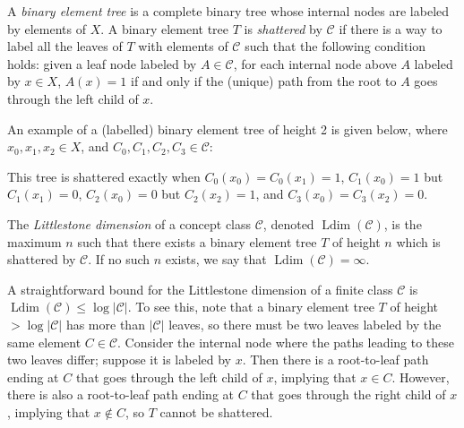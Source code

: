 \documentclass[runningheads]{llncs}
\newcommand{\mc}{\mathcal}
\DeclareMathOperator{\Ldim}{Ldim}
\begin{document}
A \emph{binary element tree} is a complete binary tree whose internal nodes are labeled by elements of $X$. 
A binary element tree $T$ is \emph{shattered} by $\mc C$ if there is a way to label all the leaves of $T$ with elements of $\mc C$ such that the following condition holds: given a leaf node labeled by $A \in \mc C$, for each internal node above $A$ labeled by $x \in X$, $A(x)=1$ if and only if the (unique) path from the root to $A$ goes through the left child of $x$. 

An example of a (labelled) binary element tree of height 2 is given below, where $x_0, x_1, x_2 \in X$, and $C_0, C_1, C_2, C_3 \in \mc C$:

\begin{center}
\end{center}

This tree is shattered exactly when $C_0(x_0) = C_0(x_1) = 1$, $C_1(x_0) = 1$ but $C_1(x_1) = 0$, $C_2(x_0) = 0$ but $C_2(x_2) = 1$, and $C_3(x_0) = C_3(x_2) = 0$.

\begin{definition}
    The \emph{Littlestone dimension} of a concept class $\mc C$, denoted $\Ldim(\mc C)$, is the maximum $n$ such that there exists a binary element tree $T$ of height $n$ which is shattered by $\mc C$. 
    If no such $n$ exists, we say that $\Ldim(\mc C) = \infty$. 
\end{definition}

\begin{remark} \label{remark:littlestone dimension of a finite class}
    A straightforward bound for the Littlestone dimension of a finite class $\mc C$ is $\Ldim(\mc C) \leq \log |\mc C|$. To see this, note that a binary element tree $T$ of height $>\log |\mc C|$ has more than $|\mc C|$ leaves, so there must be two leaves labeled by the same element $C \in \mc C$. 
    Consider the internal node where the paths leading to these two leaves differ; suppose it is labeled by $x$. 
    Then there is a root-to-leaf path ending at $C$ that goes through the left child of $x$, implying that $x \in C$.
    However, there is also a root-to-leaf path ending at $C$ that goes through the right child of $x$, implying that $x \notin C$, so $T$ cannot be shattered.
\end{remark}
\end{document}
